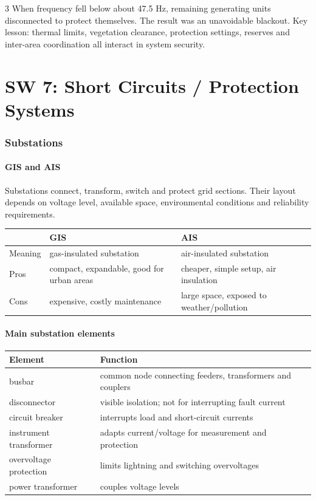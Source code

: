 \documentclass[9pt, landscape, a4paper]{article}
\begin{document}
\begin{multicols*}{3}
When frequency fell below about 47.5 Hz, remaining generating units disconnected
to protect themselves. The result was an unavoidable blackout. Key lesson:
thermal limits, vegetation clearance, protection settings, reserves and
inter-area coordination all interact in system security.

\part{SW 7: Short Circuits / Protection Systems}
\section{Substations}
\subsection{GIS and AIS}
Substations connect, transform, switch and protect grid sections. Their layout
depends on voltage level, available space, environmental conditions and
reliability requirements.

\begin{tabularx}{\columnwidth}{@{}lXX@{}}
  \toprule
  & \textbf{GIS} & \textbf{AIS}\\
  \midrule
  Meaning & gas-insulated substation & air-insulated substation\\
  Pros & compact, expandable, good for urban areas & cheaper, simple setup, air insulation\\
  Cons & expensive, costly maintenance & large space, exposed to weather/pollution\\
  \bottomrule
\end{tabularx}

\subsection{Main substation elements}
\begin{tabularx}{\columnwidth}{@{}lX@{}}
  \toprule
  \textbf{Element} & \textbf{Function}\\
  \midrule
  busbar & common node connecting feeders, transformers and couplers\\
  disconnector & visible isolation; not for interrupting fault current\\
  circuit breaker & interrupts load and short-circuit currents\\
  instrument transformer & adapts current/voltage for measurement and protection\\
  overvoltage protection & limits lightning and switching overvoltages\\
  power transformer & couples voltage levels\\
  \bottomrule
\end{tabularx}


\end{multicols*}
\end{document}
